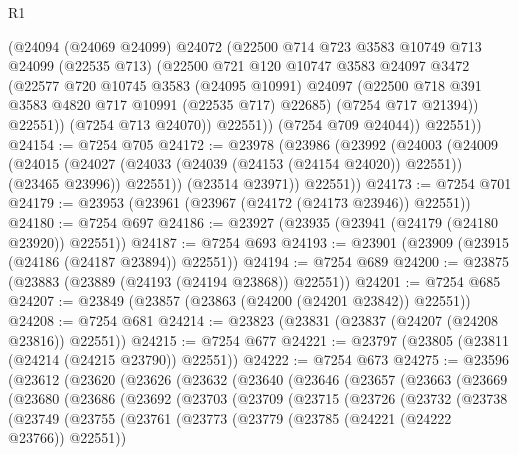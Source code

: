 \begin{lexlean}{R1}
\begin{coremodule}
              (@24094
                (@24069 @24099)
                @24072
                (@22500
                  @714
                  @723
                  @3583
                  @10749
                  @713
                  @24099
                  (@22535 @713)
                  (@22500
                    @721
                    @120
                    @10747
                    @3583
                    @24097
                    @3472
                    (@22577
                      @720
                      @10745
                      @3583
                      (@24095 @10991)
                      @24097
                      (@22500 @718 @391 @3583 @4820 @717 @10991 (@22535 @717) @22685)
                      (@7254 @717 @21394))
                    @22551))
                (@7254 @713 @24070))
              @22551))
          (@7254 @709 @24044))
        @22551))
@24154 := @7254 @705
@24172 := @23978
    (@23986
      (@23992
        (@24003
          (@24009
            (@24015
              (@24027 (@24033 (@24039 (@24153 (@24154 @24020)) @22551)) (@23465 @23996))
              @22551))
          (@23514 @23971))
        @22551))
@24173 := @7254 @701
@24179 := @23953 (@23961 (@23967 (@24172 (@24173 @23946)) @22551))
@24180 := @7254 @697
@24186 := @23927 (@23935 (@23941 (@24179 (@24180 @23920)) @22551))
@24187 := @7254 @693
@24193 := @23901 (@23909 (@23915 (@24186 (@24187 @23894)) @22551))
@24194 := @7254 @689
@24200 := @23875 (@23883 (@23889 (@24193 (@24194 @23868)) @22551))
@24201 := @7254 @685
@24207 := @23849 (@23857 (@23863 (@24200 (@24201 @23842)) @22551))
@24208 := @7254 @681
@24214 := @23823 (@23831 (@23837 (@24207 (@24208 @23816)) @22551))
@24215 := @7254 @677
@24221 := @23797 (@23805 (@23811 (@24214 (@24215 @23790)) @22551))
@24222 := @7254 @673
@24275 := @23596
    (@23612
      (@23620
        (@23626
          (@23632
            (@23640
              (@23646
                (@23657
                  (@23663
                    (@23669
                      (@23680
                        (@23686
                          (@23692
                            (@23703
                              (@23709
                                (@23715
                                  (@23726
                                    (@23732
                                      (@23738
                                        (@23749
                                          (@23755
                                            (@23761
                                              (@23773
                                                (@23779 (@23785 (@24221 (@24222 @23766)) @22551))

\end{coremodule}
\end{lexlean}

